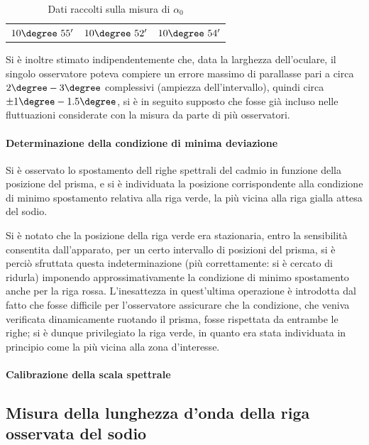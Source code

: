 \documentclass[a4paper,10pt]{article}
\begin{document}
\begin{table}[H]
	\centering
	\begin{tabular}{c|c|c}
		$10\degree~55'$  & $10\degree~52'$ & $10\degree~54'$\\
	\end{tabular}
\caption{Dati raccolti sulla misura di $\alpha_0$}
\end{table}
Si è inoltre stimato indipendentemente che, data la larghezza dell'oculare, il singolo osservatore poteva compiere un errore massimo di parallasse pari a circa $2\degree-3\degree$ complessivi (ampiezza dell'intervallo), quindi circa $\pm 1\degree-1.5\degree$, si è in seguito supposto che fosse già incluso nelle fluttuazioni considerate con la misura da parte di più osservatori.

\paragraph{Determinazione della condizione di minima deviazione} Si è osservato lo spostamento dell righe spettrali del cadmio in funzione della posizione del prisma, e si è individuata la posizione corrispondente alla condizione di minimo spostamento relativa alla riga verde, la più vicina alla riga gialla attesa del sodio.

Si è notato che la posizione della riga verde era stazionaria, entro la sensibilità consentita dall'apparato, per un certo intervallo di posizioni del prisma, si è perciò sfruttata questa indeterminazione (più correttamente: si è cercato di ridurla) imponendo approssimativamente la condizione di minimo spostamento anche per la riga rossa.
L'inesattezza in quest'ultima operazione è introdotta dal fatto che fosse difficile per l'osservatore assicurare che la condizione, che veniva verificata dinamicamente ruotando il prisma, fosse rispettata da entrambe le righe; si è dunque privilegiato la riga verde, in quanto era stata individuata in principio come la più vicina alla zona d'interesse.

\paragraph{Calibrazione della scala spettrale} 

\subsection{Misura della lunghezza d’onda della riga osservata del sodio}
\end{document}
